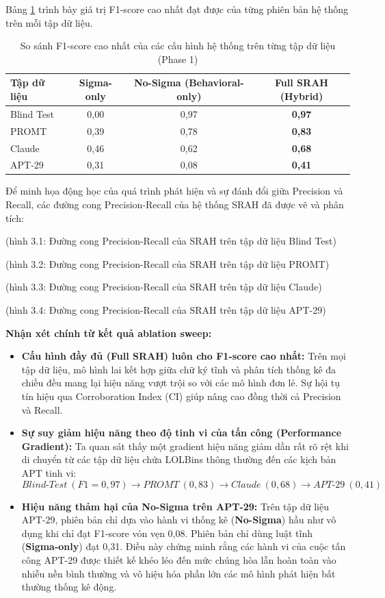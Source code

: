 \documentclass[../main.tex]{subfiles}
\begin{document}
Bảng \ref{table:ablation_sweep} trình bày giá trị F1-score cao nhất đạt được của từng phiên bản hệ thống trên mỗi tập dữ liệu.

\begin{table}[H]
\centering
\begin{tabular}{|l|c|c|c|}
\hline
\textbf{Tập dữ liệu} & \textbf{Sigma-only} & \textbf{No-Sigma (Behavioral-only)} & \textbf{Full SRAH (Hybrid)} \\ \hline
Blind Test & 0,00 & 0,97 & \textbf{0,97} \\ \hline
PROMT & 0,39 & 0,78 & \textbf{0,83} \\ \hline
Claude & 0,46 & 0,62 & \textbf{0,68} \\ \hline
APT-29 & 0,31 & 0,08 & \textbf{0,41} \\ \hline
\end{tabular}
\caption{So sánh F1-score cao nhất của các cấu hình hệ thống trên từng tập dữ liệu (Phase 1)}
\label{table:ablation_sweep}
\end{table}

Để minh họa động học của quá trình phát hiện và sự đánh đổi giữa Precision và Recall, các đường cong Precision-Recall của hệ thống SRAH đã được vẽ và phân tích:

(hình 3.1: Đường cong Precision-Recall của SRAH trên tập dữ liệu Blind Test)

(hình 3.2: Đường cong Precision-Recall của SRAH trên tập dữ liệu PROMT)

(hình 3.3: Đường cong Precision-Recall của SRAH trên tập dữ liệu Claude)

(hình 3.4: Đường cong Precision-Recall của SRAH trên tập dữ liệu APT-29)

\textbf{Nhận xét chính từ kết quả ablation sweep:}
\begin{itemize}
    \item \textbf{Cấu hình đầy đủ (Full SRAH) luôn cho F1-score cao nhất:} Trên mọi tập dữ liệu, mô hình lai kết hợp giữa chữ ký tĩnh và phân tích thống kê đa chiều đều mang lại hiệu năng vượt trội so với các mô hình đơn lẻ. Sự hội tụ tín hiệu qua Corroboration Index (CI) giúp nâng cao đồng thời cả Precision và Recall.
    \item \textbf{Sự suy giảm hiệu năng theo độ tinh vi của tấn công (Performance Gradient):} Ta quan sát thấy một gradient hiệu năng giảm dần rất rõ rệt khi di chuyển từ các tập dữ liệu chứa LOLBins thông thường đến các kịch bản APT tinh vi:
    \begin{equation}
        Blind\text{-}Test\ (F1=0,97) \rightarrow PROMT\ (0,83) \rightarrow Claude\ (0,68) \rightarrow APT\text{-}29\ (0,41)
    \end{equation}
    \item \textbf{Hiệu năng thảm hại của No-Sigma trên APT-29:} Trên tập dữ liệu APT-29, phiên bản chỉ dựa vào hành vi thống kê (\textbf{No-Sigma}) hầu như vô dụng khi chỉ đạt F1-score vỏn vẹn 0,08. Phiên bản chỉ dùng luật tĩnh (\textbf{Sigma-only}) đạt 0,31. Điều này chứng minh rằng các hành vi của cuộc tấn công APT-29 được thiết kế khéo léo đến mức chúng hòa lẫn hoàn toàn vào nhiễu nền bình thường và vô hiệu hóa phần lớn các mô hình phát hiện bất thường thống kê động.
\end{itemize}
\end{document}
